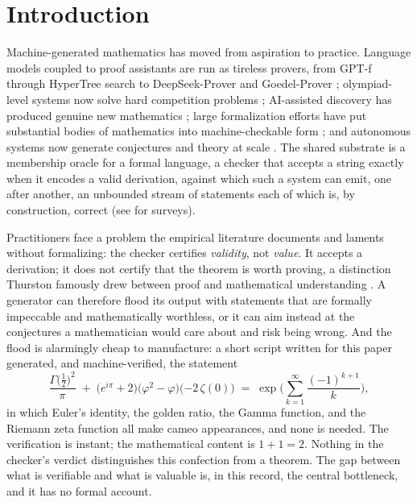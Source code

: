 \documentclass[11pt]{article}
\numberwithin{equation}{section}
\theoremstyle{plain}
\theoremstyle{definition}
\theoremstyle{remark}
\begin{document}
\section{Introduction}
\label{sec:intro}

Machine-generated mathematics has moved from aspiration to practice. Language models coupled
to proof assistants are run as tireless provers, from GPT-f through HyperTree search to
DeepSeek-Prover and Goedel-Prover
\citep{polu2020gptf,lample2022hypertree,deepseek2024prover,lin2025goedel}; olympiad-level
systems now solve hard competition problems
\citep{trinh2024alphageometry,chervonyi2025alphageometry2,hubert2026alphaproof}; AI-assisted
discovery has produced genuine new mathematics
\citep{davies2021advancing,romera2024funsearch,georgiev2025exploration}; large formalization
efforts have put substantial bodies of mathematics into machine-checkable form
\citep{avigad2023formal,aksenov2026compression}; and autonomous systems now generate
conjectures and theory at scale \citep{barkeshli2026structure,tsoukalas2025interestingness}.
The shared substrate is a membership oracle for a formal language, a checker that accepts a
string exactly when it encodes a valid derivation, against which such a system can emit, one
after another, an unbounded stream of statements each of which is, by construction, correct
(see \citet{li2024survey,ju2026ai} for surveys).

Practitioners face a problem the empirical literature documents and laments without
formalizing: the checker certifies \emph{validity}, not \emph{value}. It accepts a derivation;
it does not certify that the theorem is worth proving, a distinction Thurston famously drew
between proof and mathematical understanding \citep{thurston1994proof}. A generator can
therefore flood its output with statements that are formally impeccable and mathematically
worthless, or it can aim instead at the conjectures a mathematician would care about and risk
being wrong. And the flood is alarmingly cheap to manufacture: a short script written for
this paper generated, and machine-verified, the statement
\begin{equation*}
  \frac{\Gamma\!\big(\tfrac12\big)^{2}}{\pi}
  \;+\;
  \big(e^{i\pi} + 2\big)
  \big(\varphi^{2} - \varphi\big)
  \big({-2}\,\zeta(0)\big)
  \;=\;
  \exp\!\Bigg(\sum_{k=1}^{\infty} \frac{(-1)^{k+1}}{k}\Bigg),
\end{equation*}
in which Euler's identity, the golden ratio, the Gamma function, and the Riemann zeta
function all make cameo appearances, and none is needed. The verification is instant; the
mathematical content is $1+1=2$. Nothing in the checker's verdict distinguishes this
confection from a theorem. The gap between what is verifiable and what is valuable is, in
this record, the central bottleneck, and it has no formal account.
\end{document}
